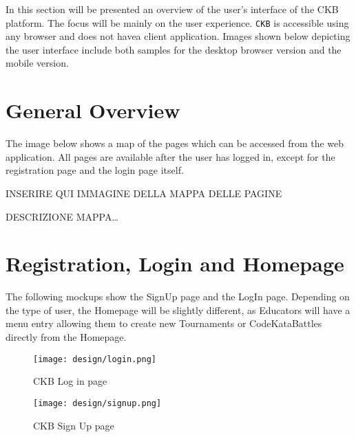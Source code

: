 In this section will be presented an overview of the user’s interface of the CKB platform.
The focus will be mainly on the user experience. 
\verb|CKB| is accessible using any browser and does not havea client application.
Images shown below depicting the user interface include both samples for the desktop browser version and the mobile version.

\section{General Overview}
\label{sec: general_overview}%
The image below shows a map of the pages which can be accessed from the web application.
All pages are available after the user has logged in, except for the registration page and the login page itself.

INSERIRE QUI IMMAGINE DELLA MAPPA DELLE PAGINE

DESCRIZIONE MAPPA\dots



\section{Registration, Login and Homepage}
\label{sec: registration_login_homepage}%
The following mockups show the SignUp page and the LogIn page. 
Depending on the type of user, the Homepage will be slightly different, as Educators will have a menu entry allowing them to
create new Tournaments or CodeKataBattles directly from the Homepage.

\begin{figure}[H]
    \begin{minipage}{0.45\linewidth}
        \centering
        \texttt{[image: design/login.png]}
        \caption{CKB Log in page}
        \label{fig: login}
    \end{minipage}\hfill
    \begin{minipage}{0.45\linewidth}
        \centering
        \texttt{[image: design/signup.png]}
        \caption{CKB Sign Up page}
        \label{fig: signup}
    \end{minipage}
\end{figure}

